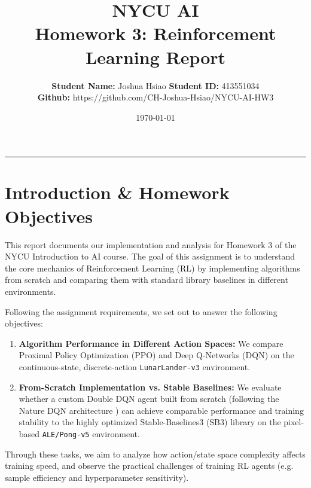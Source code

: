 \documentclass[12pt]{article}
\begin{document}
\title{\vspace{-2cm}\textbf{NYCU AI\\ Homework 3: Reinforcement Learning Report}}
\author{
    \textbf{Student Name:} Joshua Hsiao \qquad \textbf{Student ID:} 413551034 \\
    \textbf{Github:} https://github.com/CH-Joshua-Hsiao/NYCU-AI-HW3
}
\date{\today}

\maketitle

\hrule
\vspace{0.5cm}

\section{Introduction \& Homework Objectives}
\label{sec:intro}

This report documents our implementation and analysis for Homework 3 of the NYCU Introduction to AI course. The goal of this assignment is to understand the core mechanics of Reinforcement Learning (RL) by implementing algorithms from scratch and comparing them with standard library baselines in different environments.

Following the assignment requirements, we set out to answer the following objectives:
\begin{enumerate}
  \item \textbf{Algorithm Performance in Different Action Spaces:} We compare Proximal Policy Optimization (PPO) and Deep Q-Networks (DQN) on the continuous-state, discrete-action \texttt{LunarLander-v3} environment.
  \item \textbf{From-Scratch Implementation vs. Stable Baselines:} We evaluate whether a custom Double DQN agent built from scratch (following the Nature DQN architecture \citep{mnih2015human}) can achieve comparable performance and training stability to the highly optimized Stable-Baselines3 (SB3) library \citep{raffin2021stable} on the pixel-based \texttt{ALE/Pong-v5} environment.
\end{enumerate}

Through these tasks, we aim to analyze how action/state space complexity affects training speed, and observe the practical challenges of training RL agents (e.g. sample efficiency and hyperparameter sensitivity).
\end{document}
